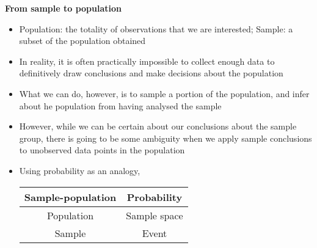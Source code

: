 \documentclass[a4paper]{article}
\newcommand{\heading}[1]{{\small\textbf{#1}}}
\begin{document}
\begin{multicols*}{4}
\heading{From sample to population}
\begin{itemize} \itemsep -0.5em
    \item Population: the totality of observations that we are
        interested; Sample: a subset of the population obtained
    \item In reality, it is often practically impossible to collect
        enough data to definitively draw conclusions and make decisions
        about the population
    \item What we can do, however, is to sample a portion of the
        population, and infer about he population from having analysed
        the sample
    \item However, while we can be certain about our conclusions about
        the sample group, there is going to be some ambiguity when we
        apply sample conclusions to unobserved data points in the
        population
    \item Using probability as an analogy,

    \begin{tabular}{|c|c|}
        \hline
        \textbf{Sample-population} & \textbf{Probability} \\
        \hline
        Population                 & Sample space         \\
        Sample                     & Event                \\
        \hline
    \end{tabular}
\end{itemize}


\end{multicols*}
\end{document}

